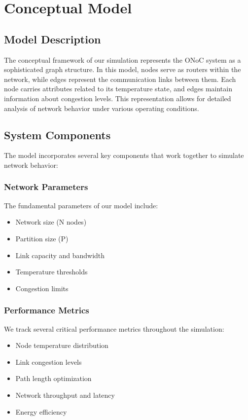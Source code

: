 \documentclass[12pt]{article}
\begin{document}
\section{Conceptual Model}
\subsection{Model Description}
The conceptual framework of our simulation represents the ONoC system as a sophisticated graph structure. In this model, nodes serve as routers within the network, while edges represent the communication links between them. Each node carries attributes related to its temperature state, and edges maintain information about congestion levels. This representation allows for detailed analysis of network behavior under various operating conditions.

\subsection{System Components}
The model incorporates several key components that work together to simulate network behavior:

\subsubsection{Network Parameters}
The fundamental parameters of our model include:
\begin{itemize}[noitemsep]
    \item Network size (N nodes)
    \item Partition size (P)
    \item Link capacity and bandwidth
    \item Temperature thresholds
    \item Congestion limits
\end{itemize}

\subsubsection{Performance Metrics}
We track several critical performance metrics throughout the simulation:
\begin{itemize}[noitemsep]
    \item Node temperature distribution
    \item Link congestion levels
    \item Path length optimization
    \item Network throughput and latency
    \item Energy efficiency
\end{itemize}
\end{document}
